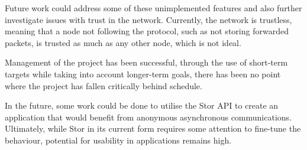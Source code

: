 		Future work could address some of these unimplemented features and also further investigate issues with trust in the network. Currently, the network is trustless, meaning that a node not following the protocol, such as not storing forwarded packets, is trusted as much as any other node, which is not ideal.
		
		Management of the project has been successful, through the use of short-term targets while taking into account longer-term goals, there has been no point where the project has fallen critically behind schedule.

		In the future, some work could be done to utilise the Stor API to create an application that would benefit from anonymous asynchronous communications.	Ultimately, while Stor in its current form requires some attention to fine-tune the behaviour, potential for usability in applications remains high.